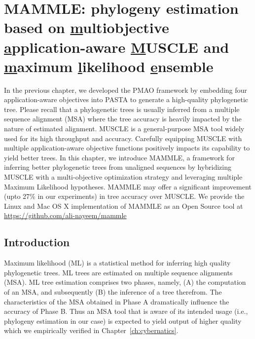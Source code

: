 
\graphicspath{{mammle/}}

\chapter{MAMMLE: phylogeny estimation based on \underline{m}ultiobjective \underline{a}pplication-aware \underline{M}USCLE and \underline{m}aximum \underline{l}ikelihood \underline{e}nsemble} \label{ch:mammle}


In the previous chapter, we developed the PMAO framework by embedding four application-aware objectives into PASTA to generate a high-quality phylogenetic tree.
Please recall that a phylogenetic trees is usually inferred from a multiple sequence alignment (MSA) where the tree accuracy is heavily impacted by the nature of estimated alignment. 
MUSCLE is a general-purpose MSA tool widely used for its high throughput and accuracy. Carefully equipping MUSCLE with multiple application-aware objective functions positively impacts its capability to yield better trees. In this chapter, we introduce MAMMLE, a framework for inferring better phylogenetic trees from unaligned sequences by hybridizing MUSCLE with a multi-objective optimization strategy and leveraging multiple Maximum Likelihood hypotheses. MAMMLE may offer a significant improvement (upto 27\% in our experiments) in tree accuracy over MUSCLE.
We provide the Linux and Mac OS X implementation of MAMMLE as an Open Source tool at \url{https://github.com/ali-nayeem/mammle}

\section{Introduction}
Maximum likelihood (ML) is a statistical method for inferring high quality phylogenetic trees. ML trees are estimated on multiple sequence alignments (MSA). ML tree estimation comprises two phases, namely, (A) the computation of an MSA, and subsequently (B) the inference of a tree therefrom. The characteristics of the MSA obtained in Phase A dramatically influence the accuracy of Phase B. Thus an MSA tool that is aware of its intended usage (i.e., phylogeny estimation in our case) is expected to yield output of higher quality which we empirically verified in Chapter~\ref{ch:cybernatics}.

